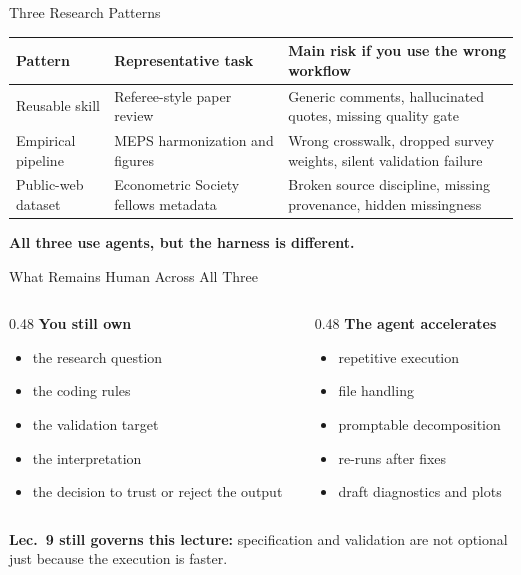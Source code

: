 \documentclass[10pt,english,aspectratio=169]{beamer}
\begin{document}
\begin{frame}{Three Research Patterns}
\small
\begin{tabular}{p{3.0cm}p{4.1cm}p{5.2cm}}
\toprule
\textbf{Pattern} & \textbf{Representative task} & \textbf{Main risk if you use the wrong workflow} \\
\midrule
Reusable skill & Referee-style paper review & Generic comments, hallucinated quotes, missing quality gate \\
Empirical pipeline & MEPS harmonization and figures & Wrong crosswalk, dropped survey weights, silent validation failure \\
Public-web dataset & Econometric Society fellows metadata & Broken source discipline, missing provenance, hidden missingness \\
\bottomrule
\end{tabular}

\vspace{0.3cm}
\textbf{All three use agents, but the harness is different.}
\end{frame}

\begin{frame}{What Remains Human Across All Three}
\begin{columns}[T]
\begin{column}{0.48\textwidth}
\textbf{You still own}
\begin{itemize}
    \item the research question
    \item the coding rules
    \item the validation target
    \item the interpretation
    \item the decision to trust or reject the output
\end{itemize}
\end{column}
\begin{column}{0.48\textwidth}
\textbf{The agent accelerates}
\begin{itemize}
    \item repetitive execution
    \item file handling
    \item promptable decomposition
    \item re-runs after fixes
    \item draft diagnostics and plots
\end{itemize}
\end{column}
\end{columns}

\vspace{0.35cm}
\textbf{Lec.~9 still governs this lecture:} specification and validation are not optional just because the execution is faster.
\end{frame}
\end{document}
